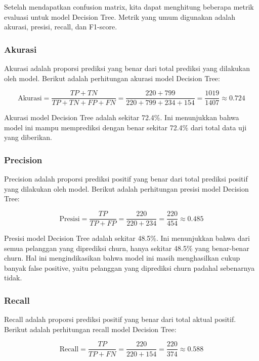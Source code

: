 Setelah mendapatkan confusion matrix, kita dapat menghitung beberapa metrik evaluasi untuk model Decision Tree. Metrik yang umum digunakan adalah akurasi, presisi, recall, dan F1-score.

\subsubsection*{Akurasi}
Akurasi adalah proporsi prediksi yang benar dari total prediksi yang dilakukan oleh model. Berikut adalah perhitungan akurasi model Decision Tree:

\begin{equation}
    \text{Akurasi} = \frac{TP + TN}{TP + TN + FP + FN} = \frac{220 + 799}{220 + 799 + 234 + 154} = \frac{1019}{1407} \approx 0.724
\end{equation}

Akurasi model Decision Tree adalah sekitar 72.4\%. Ini menunjukkan bahwa model ini mampu memprediksi dengan benar sekitar 72.4\% dari total data uji yang diberikan.

\subsubsection*{Precision}
Precision adalah proporsi prediksi positif yang benar dari total prediksi positif yang dilakukan oleh model. Berikut adalah perhitungan presisi model Decision Tree:

\begin{equation}
    \text{Presisi} = \frac{TP}{TP + FP} = \frac{220}{220 + 234} = \frac{220}{454} \approx 0.485
\end{equation}

Presisi model Decision Tree adalah sekitar 48.5\%. Ini menunjukkan bahwa dari semua pelanggan yang diprediksi churn, hanya sekitar 48.5\% yang benar-benar churn. Hal ini mengindikasikan bahwa model ini masih menghasilkan cukup banyak false positive, yaitu pelanggan yang diprediksi churn padahal sebenarnya tidak.

\subsubsection*{Recall}
Recall adalah proporsi prediksi positif yang benar dari total aktual positif. Berikut adalah perhitungan recall model Decision Tree:

\begin{equation}
    \text{Recall} = \frac{TP}{TP + FN} = \frac{220}{220 + 154} = \frac{220}{374} \approx 0.588
\end{equation}

